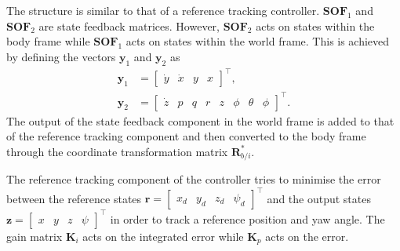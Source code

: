 \documentclass[a4paper,12pt]{article}
\begin{document}
        The structure is similar to that of a reference tracking controller. \(\mathbf{SOF}_1\) and \(\mathbf{SOF}_2\) are state feedback matrices. However, \(\mathbf{SOF}_2\) acts on states within the body frame while \(\mathbf{SOF}_1\) acts on states within the world frame. This is achieved by defining the vectors \(\mathbf{y}_1\) and \(\mathbf{y}_2\) as
        \begin{align}
            \mathbf{y}_1 & = \begin{bmatrix} \dot{y} & \dot{x} & y & x \end{bmatrix}^\top,\\
            \mathbf{y}_2 & = \begin{bmatrix} \dot{z} & p & q & r & z & \phi & \theta & \phi \end{bmatrix}^\top.
        \end{align}
        The output of the state feedback component in the world frame is added to that of the reference tracking component and then converted to the body frame through the coordinate transformation matrix \(\mathbf{R}^*_{b/i}\).

        The reference tracking component of the controller tries to minimise the error between the reference states \(\mathbf{r} = \begin{bmatrix} x_d & y_d & z_d  & \psi_d \end{bmatrix}^\top \) and the output states \(\mathbf{z} = \begin{bmatrix} x & y & z  & \psi \end{bmatrix}^\top \) in order to track a reference position and yaw angle. The gain matrix \(\mathbf{K}_i\) acts on the integrated error while \(\mathbf{K}_p\) acts on the error.
\end{document}
